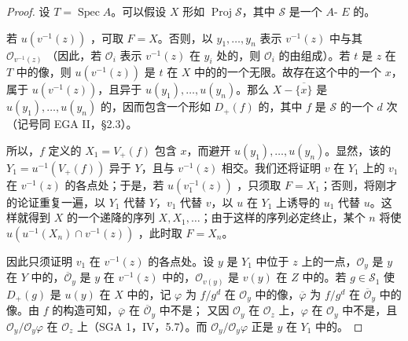 \begin{proof}
设 $T=\operatorname{Spec}A$。可以假设 $X$ 形如 $\operatorname{Proj}\mathscr S$，其中 $\mathscr S$ 是一个 $A$- $E$ 的。

若 $u(v^{-1}(z))$ ，可取 $F=X$。否则，以 $y_1,\ldots,y_n$ 表示 $v^{-1}(z)$ 中与其 $\mathcal O_{v^{-1}(z)}$ （因此，若 $\mathcal O_i$ 表示 $v^{-1}(z)$ 在 $y_i$ 处的，则 $\mathcal O_i$ 的由组成）。若 $t$ 是 $z$ 在 $T$ 中的像，则 $u(v^{-1}(z))$ 是 $t$ 在 $X$ 中的的一个无限。故存在这个中的一个 $x$，属于 $u(v^{-1}(z))$，且异于 $u(y_1),\ldots,u(y_n)$。那么 $X-\overline{\{x\}}$ 是 $u(y_1),\ldots,u(y_n)$ 的，因而包含一个形如 $D_+(f)$ 的，其中 $f$ 是 $\mathscr S$ 的一个 $d$ 次（记号同 EGA II，\S 2.3）。

所以，$f$ 定义的 $X_1=V_+(f)$ 包含 $x$，而避开 $u(y_1),\ldots,u(y_n)$。显然，该的 $Y_1=u^{-1}(V_+(f))$ 异于 $Y$，且与 $v^{-1}(z)$ 相交。我们还将证明 $v$ 在 $Y_1$ 上的 $v_1$ 在 $v^{-1}(z)$ 的各点处；于是，若 $u(v_1^{-1}(z))$ ，只须取 $F=X_1$；否则，将刚才的论证重复一遍，以 $Y_1$ 代替 $Y$，$v_1$ 代替 $v$，以 $u$ 在 $Y_1$ 上诱导的 $u_1$ 代替 $u$。这样就得到 $X$ 的一个递降的序列 $X,X_1,\ldots$；由于这样的序列必定终止，某个 $n$ 将使 $u(u^{-1}(X_n)\cap v^{-1}(z))$ ，此时取 $F=X_n$。

因此只须证明 $v_1$ 在 $v^{-1}(z)$ 的各点处。设 $y$ 是 $Y_1$ 中位于 $z$ 上的一点，$\mathcal O_y$ 是 $y$ 在 $Y$ 中的，$\overline{\mathcal O}_y$ 是 $y$ 在 $v^{-1}(z)$ 中的，$\mathcal O_{v(y)}$ 是 $v(y)$ 在 $Z$ 中的。若 $g\in\mathscr S_1$ 使 $D_+(g)$ 是 $u(y)$ 在 $X$ 中的，记 $\varphi$ 为 $f/g^d$ 在 $\mathcal O_y$ 中的像，$\overline\varphi$ 为 $f/g^d$ 在 $\overline{\mathcal O}_y$ 中的像。由 $f$ 的构造可知，$\overline\varphi$ 在 $\overline{\mathcal O}_y$ 中不是；
又因 $\mathcal O_y$ 在 $\mathcal O_z$ 上，$\varphi$ 在 $\mathcal O_y$ 中不是，且 $\mathcal O_y/\mathcal O_y\varphi$ 在 $\mathcal O_z$ 上（SGA 1，IV，5.7）。而 $\mathcal O_y/\mathcal O_y\varphi$ 正是 $y$ 在 $Y_1$ 中的。
\end{proof}

